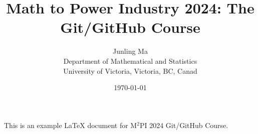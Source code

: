 \documentclass{article}
\title{Math to Power Industry 2024: The Git/GitHub Course}
\author{Junling Ma\\Department of Mathematical and Statistics\\
    University of Victoria, Victoria, BC, Canad}
\date{\today}
\begin{document}
    \maketitle

    This is an example LaTeX document for M$^2$PI 2024 Git/GitHub Course.
\end{document}

